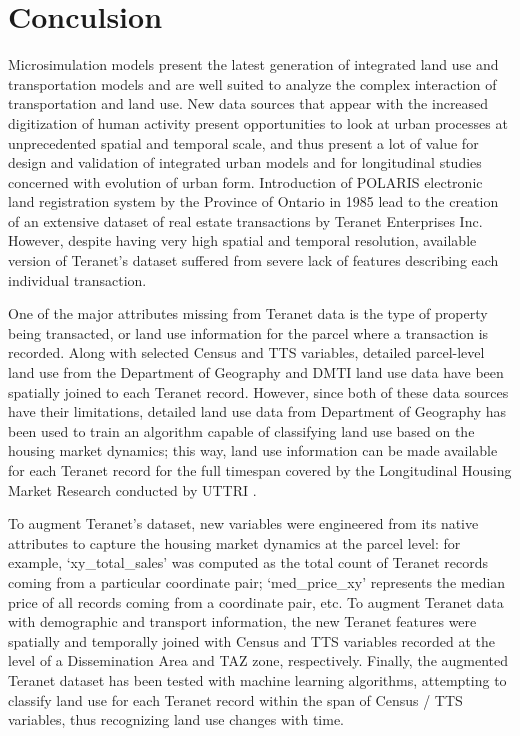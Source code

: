 \chapter{Conculsion} \label{ch:conclusion}

Microsimulation models present the latest generation of integrated land use and transportation models and are well suited to analyze the complex interaction of transportation and land use.
New data sources that appear with the increased digitization of human activity present opportunities to look at urban processes at unprecedented spatial and temporal scale, and thus present a lot of value for design and validation of integrated urban models and for longitudinal studies concerned with evolution of urban form.
Introduction of POLARIS electronic land registration system by the Province of Ontario in 1985 lead to the creation of an extensive dataset of real estate transactions by Teranet Enterprises Inc.
However, despite having very high spatial and temporal resolution, available version of Teranet's dataset suffered from severe lack of features describing each individual transaction.

One of the major attributes missing from Teranet data is the type of property being transacted, or land use information for the parcel where a transaction is recorded.
Along with selected Census and TTS variables, detailed parcel-level land use from the Department of Geography and DMTI land use data have been spatially joined to each Teranet record.
However, since both of these data sources have their limitations, detailed land use data from Department of Geography has been used to train an algorithm capable of classifying land use based on the housing market dynamics;
this way, land use information can be made available for each Teranet record for the full timespan covered by the Longitudinal Housing Market Research conducted by UTTRI .

To augment Teranet's dataset, new variables were engineered from its native attributes to capture the housing market dynamics at the parcel level:
for example, `xy\_total\_sales' was computed as the total count of Teranet records coming from a particular coordinate pair;
`med\_price\_xy' represents the median price of all records coming from a coordinate pair, etc.
To augment Teranet data with demographic and transport information, the new Teranet features were spatially and temporally joined with Census and TTS variables recorded at the level of a Dissemination Area and TAZ zone, respectively.
Finally, the augmented Teranet dataset has been tested with machine learning algorithms, attempting to classify land use for each Teranet record within the span of Census / TTS variables, thus recognizing land use changes with time.

